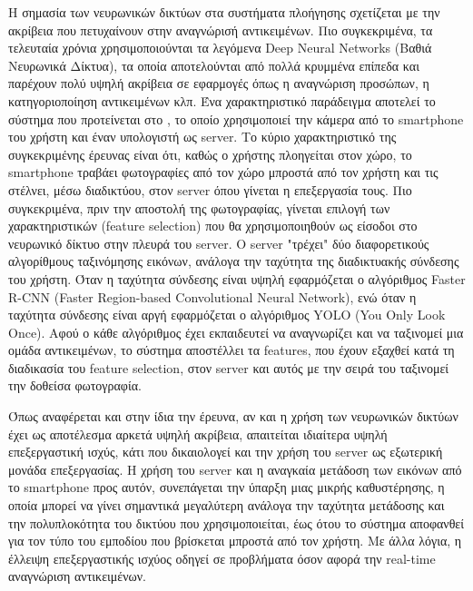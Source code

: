 Η σημασία των νευρωνικών δικτύων στα συστήματα πλοήγησης σχετίζεται με την ακρίβεια που πετυχαίνουν στην αναγνώρισή αντικειμένων. Πιο συγκεκριμένα, τα τελευταία χρόνια χρησιμοποιούνται τα λεγόμενα Deep Neural Networks (Βαθιά Νευρωνικά Δίκτυα), τα οποία αποτελούνται από πολλά κρυμμένα επίπεδα και παρέχουν πολύ υψηλή ακρίβεια σε εφαρμογές όπως η αναγνώριση προσώπων, η κατηγοριοποίηση αντικειμένων κλπ. Ένα χαρακτηριστικό παράδειγμα αποτελεί το σύστημα που προτείνεται στο \cite{lin2017simple}, το οποίο χρησιμοποιεί την κάμερα από το smartphone του χρήστη και έναν υπολογιστή ως server. Το κύριο χαρακτηριστικό της συγκεκριμένης έρευνας είναι ότι, καθώς ο χρήστης πλοηγείται στον χώρο, το smartphone τραβάει φωτογραφίες από τον χώρο μπροστά από τον χρήστη και τις στέλνει, μέσω διαδικτύου, στον server όπου γίνεται η επεξεργασία τους. Πιο συγκεκριμένα, πριν την αποστολή της φωτογραφίας, γίνεται επιλογή των χαρακτηριστικών (feature selection) που θα χρησιμοποιηθούν ως είσοδοι στο νευρωνικό δίκτυο στην πλευρά του server. Ο server "τρέχει" δύο διαφορετικούς αλγορίθμους ταξινόμησης εικόνων, ανάλογα την ταχύτητα της διαδικτυακής σύνδεσης του χρήστη. Όταν η ταχύτητα σύνδεσης είναι υψηλή εφαρμόζεται ο αλγόριθμος Faster R-CNN (Faster Region-based Convolutional Neural Network), ενώ όταν η ταχύτητα σύνδεσης είναι αργή εφαρμόζεται ο αλγόριθμος YOLO (You Only Look Once). Αφού ο κάθε αλγόριθμος έχει εκπαιδευτεί να αναγνωρίζει και να ταξινομεί μια ομάδα αντικειμένων, το σύστημα αποστέλλει τα features, που έχουν εξαχθεί κατά τη διαδικασία του feature selection, στον server και αυτός με την σειρά του ταξινομεί την δοθείσα φωτογραφία. 

Όπως αναφέρεται και στην ίδια την έρευνα, αν και η χρήση των νευρωνικών δικτύων έχει ως αποτέλεσμα αρκετά υψηλή ακρίβεια, απαιτείται ιδιαίτερα υψηλή επεξεργαστική ισχύς, κάτι που δικαιολογεί και την χρήση του server ως εξωτερική μονάδα επεξεργασίας. Η χρήση του server και η αναγκαία μετάδοση των εικόνων από το smartphone προς αυτόν, συνεπάγεται την ύπαρξη μιας μικρής καθυστέρησης, η οποία μπορεί να γίνει σημαντικά μεγαλύτερη ανάλογα την ταχύτητα μετάδοσης και την πολυπλοκότητα του δικτύου που χρησιμοποιείται, έως ότου το σύστημα αποφανθεί για τον τύπο του εμποδίου που βρίσκεται μπροστά από τον χρήστη. Με άλλα λόγια, η έλλειψη επεξεργαστικής ισχύος οδηγεί σε προβλήματα όσον αφορά την real-time αναγνώριση αντικειμένων.

